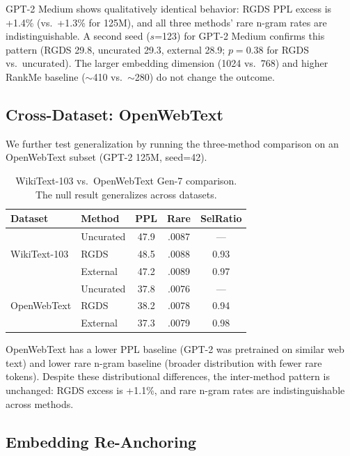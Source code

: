 \documentclass[11pt]{article}
\begin{document}
GPT-2 Medium shows qualitatively identical behavior: RGDS PPL excess is +1.4\% (vs.\ +1.3\% for 125M), and all three methods' rare n-gram rates are indistinguishable. A second seed ($s$=123) for GPT-2 Medium confirms this pattern (RGDS 29.8, uncurated 29.3, external 28.9; $p = 0.38$ for RGDS vs.\ uncurated). The larger embedding dimension (1024 vs.\ 768) and higher RankMe baseline ($\sim$410 vs.\ $\sim$280) do not change the outcome.

\subsection{Cross-Dataset: OpenWebText}
\label{sec:owt}

We further test generalization by running the three-method comparison on an OpenWebText subset (GPT-2 125M, seed=42).

\begin{table}[h]
\centering
\caption{WikiText-103 vs.\ OpenWebText Gen-7 comparison. The null result generalizes across datasets.}
\label{tab:dataset}
\small
\begin{tabular}{ll ccc}
\toprule
\textbf{Dataset} & \textbf{Method} & \textbf{PPL} & \textbf{Rare} & \textbf{SelRatio} \\
\midrule
\multirow{3}{*}{WikiText-103} & Uncurated & 47.9 & .0087 & --- \\
                               & RGDS      & 48.5 & .0088 & 0.93 \\
                               & External  & 47.2 & .0089 & 0.97 \\
\midrule
\multirow{3}{*}{OpenWebText}  & Uncurated & 37.8 & .0076 & --- \\
                               & RGDS      & 38.2 & .0078 & 0.94 \\
                               & External  & 37.3 & .0079 & 0.98 \\
\bottomrule
\end{tabular}
\end{table}

OpenWebText has a lower PPL baseline (GPT-2 was pretrained on similar web text) and lower rare n-gram baseline (broader distribution with fewer rare tokens). Despite these distributional differences, the inter-method pattern is unchanged: RGDS excess is +1.1\%, and rare n-gram rates are indistinguishable across methods.

\subsection{Embedding Re-Anchoring}
\label{sec:reanchor}
\end{document}
